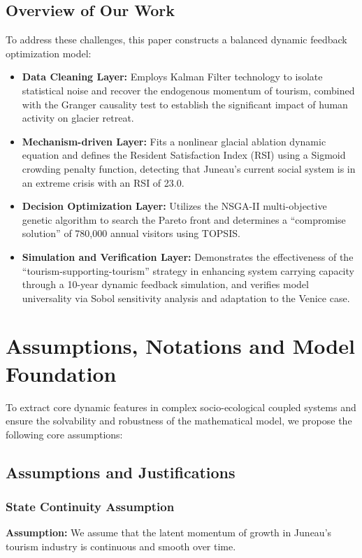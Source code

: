 \documentclass{mcmthesis}
\begin{document}
\subsection{Overview of Our Work}
To address these challenges, this paper constructs a balanced dynamic feedback optimization model:
\begin{itemize}
    \item \textbf{Data Cleaning Layer:} Employs Kalman Filter technology to isolate statistical noise and recover the endogenous momentum of tourism, combined with the Granger causality test to establish the significant impact of human activity on glacier retreat.
    \item \textbf{Mechanism-driven Layer:} Fits a nonlinear glacial ablation dynamic equation and defines the Resident Satisfaction Index (RSI) using a Sigmoid crowding penalty function, detecting that Juneau's current social system is in an extreme crisis with an RSI of 23.0.
    \item \textbf{Decision Optimization Layer:} Utilizes the NSGA-II multi-objective genetic algorithm to search the Pareto front and determines a ``compromise solution'' of 780,000 annual visitors using TOPSIS.
    \item \textbf{Simulation and Verification Layer:} Demonstrates the effectiveness of the ``tourism-supporting-tourism'' strategy in enhancing system carrying capacity through a 10-year dynamic feedback simulation, and verifies model universality via Sobol sensitivity analysis and adaptation to the Venice case.
\end{itemize}

\section{Assumptions, Notations and Model Foundation}
To extract core dynamic features in complex socio-ecological coupled systems and ensure the solvability and robustness of the mathematical model, we propose the following core assumptions:

\subsection{Assumptions and Justifications}

\subsubsection{State Continuity Assumption}
\textbf{Assumption:} We assume that the latent momentum of growth in Juneau's tourism industry is continuous and smooth over time.
\end{document}
